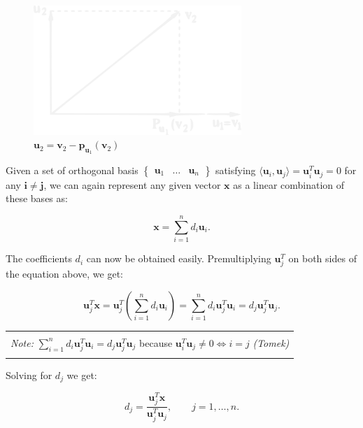 \documentclass[10pt,b5paper,titlepage]{book}
\newenvironment{bbox}[1][1.0]
{
    \begin{center}
        \begin{tabular}{|p{#1\textwidth}|}
            \hline\\
}
{
            \\\\\hline
        \end{tabular}
    \end{center}
}
\begin{document}
\begin{figure}[h]
    \centering
    \includegraphics[width=0.7\textwidth]{./img/GramSchmidt_inv}
    \caption{$\mathbf{u}_{2} = \mathbf{v}_{2} - \mathbf{p}_{\mathbf{u}_{1}}(\mathbf{v}_{2})$}
    \label{fig:GramSchmidt}
\end{figure}

Given a set of orthogonal basis $\begin{Bmatrix} \mathbf{u}_1 & \ldots & \mathbf{u}_n \end{Bmatrix}$
satisfying $\langle \mathbf{u}_{i}, \mathbf{u}_{j} \rangle = \mathbf{u}_{i}^{T}\mathbf{u}_{j} = 0$
for any $\mathbf{i \neq j}$, we can again represent any given vector $\mathbf{x}$
as a linear combination of these bases as:

\begin{equation}
    \mathbf{x} = \sum_{i=1}^{n} d_{i} \mathbf{u}_{i}
.\end{equation}

The coefficients $d_{i}$ can now be obtained easily. Premultiplying
$\mathbf{u}_{j}^{T}$ on both sides of the equation above, we get:

\begin{equation}
    \mathbf{u}_{j}^{T} \mathbf{x}
    = \mathbf{u}_{j}^{T} \left(
    \sum_{i=1}^{n} d_{i} \mathbf{u}_{i}\right)
    = \sum_{i=1}^{n} d_{i} \mathbf{u}_{j}^{T} \mathbf{u}_{i}
    = d_{j} \mathbf{u}_{j}^{T} \mathbf{u}_{j}
.\end{equation}

\begin{bbox}[0.95]
\textit{Note:}
    $\sum_{i=1}^{n} d_{i} \mathbf{u}_{j}^{T} \mathbf{u}_{i} = d_{j} \mathbf{u}_{j}^{T} \mathbf{u}_{j}$
    because $\mathbf{u}_{i}^{T} \mathbf{u}_{j} \neq 0 \iff i = j$ \textit{(Tomek)}
\end{bbox}

Solving for $d_{j}$ we get:

\begin{equation}
    d_{j} = \frac{\mathbf{u}_{j}^{T}\mathbf{x}}{\mathbf{u}_{j}^{T}\mathbf{u}_{j}},
    \qquad j = 1, \ldots, n
.\end{equation}
\end{document}
